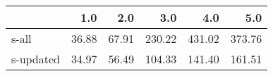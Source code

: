 \begin{tabular}{lrrrrr}
\toprule
{} &   1.0 &   2.0 &    3.0 &    4.0 &    5.0 \\
\midrule
s-all     & 36.88 & 67.91 & 230.22 & 431.02 & 373.76 \\
s-updated & 34.97 & 56.49 & 104.33 & 141.40 & 161.51 \\
\bottomrule
\end{tabular}
